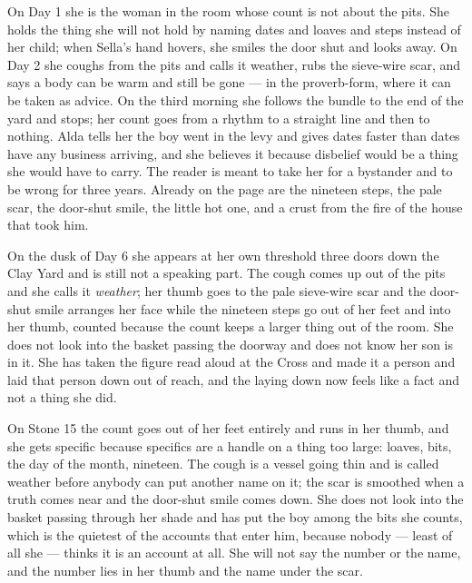 \documentclass{design/chronicle}
\begin{document}
{
On Day 1 she is the woman in the room whose count is not about the pits. She holds the thing she will not hold by naming dates and loaves and steps instead of her child; when Sella’s hand hovers, she smiles the door shut and looks away. On Day 2 she coughs from the pits and calls it weather, rubs the sieve-wire scar, and says a body can be warm and still be gone --- in the proverb-form, where it can be taken as advice. On the third morning she follows the bundle to the end of the yard and stops; her count goes from a rhythm to a straight line and then to nothing. Alda tells her the boy went in the levy and gives dates faster than dates have any business arriving, and she believes it because disbelief would be a thing she would have to carry. The reader is meant to take her for a bystander and to be wrong for three years. Already on the page are the nineteen steps, the pale scar, the door-shut smile, the little hot one, and a crust from the fire of the house that took him.

On the dusk of Day 6 she appears at her own threshold three doors down the Clay Yard and is still not a speaking part. The cough comes up out of the pits and she calls it \emph{weather}; her thumb goes to the pale sieve-wire scar and the door-shut smile arranges her face while the nineteen steps go out of her feet and into her thumb, counted because the count keeps a larger thing out of the room. She does not look into the basket passing the doorway and does not know her son is in it. She has taken the figure read aloud at the Cross and made it a person and laid that person down out of reach, and the laying down now feels like a fact and not a thing she did.

On Stone 15 the count goes out of her feet entirely and runs in her thumb, and she gets specific because specifics are a handle on a thing too large: loaves, bits, the day of the month, nineteen. The cough is a vessel going thin and is called weather before anybody can put another name on it; the scar is smoothed when a truth comes near and the door-shut smile comes down. She does not look into the basket passing through her shade and has put the boy among the bits she counts, which is the quietest of the accounts that enter him, because nobody --- least of all she --- thinks it is an account at all. She will not say the number or the name, and the number lies in her thumb and the name under the scar.

}
\end{document}
